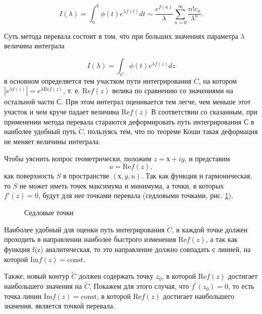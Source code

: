 \documentclass[14pt]{article}
\numberwithin{figure}{section}
\numberwithin{equation}{section}
\renewcommand{\Re}{\mathrm{Re}}
\renewcommand{\Im}{\mathrm{Im}}
\newcommand{\const}{\mathrm{const}}
\begin{document}
\begin{equation}\label{eq:eq10}
I(\lambda) = \int_{a}^{b}\phi(t)e^{\lambda f(t)}dt \sim \frac{e^{f(a)}}{\lambda}\sum_{n=0}^{\infty}\frac{n! c_n}{\lambda^n}.
\end{equation}

Суть метода перевала состоит в том, что при больших значениях параметра $\lambda$ величина интеграла

$$
I(\lambda) = \int_{C}^{}\phi(t)e^{\lambda f(z)}dz
$$
в основном определяется тем участком пути интегрирования $C$, на котором $|e^{\lambda f(z)}|=e^{\lambda \Re f(z)}$, т. е. $\Re f(z)$ велика по сравнению со значениями на остальной части $С$. При этом интеграл оценивается тем легче, чем меньше этот участок и чем круче падает величина $\Re f(z)$ В соответствии со сказанным, при применении метода перевала стараются деформировать путь интегрирования С в наиболее удобный путь $\widetilde{C}$, пользуясь тем, что по теореме Коши такая деформация не меняет величины интеграла.\cite{Urmat}

Чтобы уяснить вопрос геометрически, положим $z = х + iy$, и представим
$$
u = \Re f(z),
$$
как поверхность $S$ в пространстве $(х, y, u)$. Так как функция и гармоническая, то $S$ не может иметь точек максимума и минимума, а точки, в которых $f'(z) = 0$, будут для нее точками перевала (седловыми точками, рис. \ref{ris:image2}).

\begin{figure}[h]
	\caption{Седловые точки}
	\label{ris:image2}
	\end{figure}

Наиболее удобный для оценки путь интегрирования $\widetilde{C}$, в каждой точке должен проходить в направлении наиболее быстрого изменения $\Re f(z)$, а так как функция f(z) аналитическая, то это направление должно совпадать с линией, на которой $\Im f(z) = \const$. 

Также, новый контур $\widetilde{C}$ должен содержать точку $z_0$, в которой $\Re f(z)$ достигает наибольшего значения на $\widetilde{C}$. Покажем для этого случая, что $f^\prime (z_0) = 0$, то есть точка линии $\Im f(z) = \const$, в которой $\Re f (z)$ достигает наибольшего значения, является точкой перевала.
\end{document}
